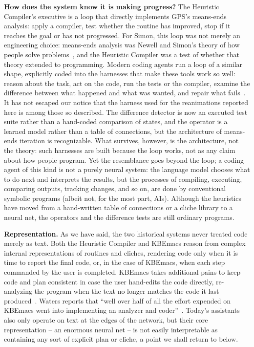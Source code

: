 \documentclass[11pt]{article}
\begin{document}
\textbf{How does the system know it is making progress?} The Heuristic
Compiler's executive is a loop that directly implements GPS's
means-ends analysis: apply a compiler, test whether the routine has
improved, stop if it reaches the goal or has not progressed. For
Simon, this loop was not merely an engineering choice: means-ends
analysis was Newell and Simon's theory of how people solve
problems~\cite{newelletat1958,newell1972hps}, and the Heuristic
Compiler was a test of whether that theory extended to programming.
Modern coding agents run a loop of a similar shape, explicitly coded
into the harnesses that make these tools work so well: reason about
the task, act on the code, run the tests or the compiler, examine the
difference between what happened and what was wanted, and repair what
fails~\cite{yao2023react,yang2024sweagent,schluntz2024agents,claudecodeworks}. It
has not escaped our notice that the harness used for the reanimations
reported here is among those so described. The difference detector is
now an executed test suite rather than a hand-coded comparison of
states, and the operator is a learned model rather than a table of
connections, but the architecture of means-ends iteration is
recognizable. What survives, however, is the architecture, not the
theory: such harnesses are built because the loop works, not as any
claim about how people program. Yet the resemblance goes beyond the
loop; a coding agent of this kind is not a purely neural system: the
language model chooses what to do next and interprets the results, but
the processes of compiling, executing, comparing outputs, tracking
changes, and so on, are done by conventional symbolic programs (albeit
not, for the most part, AIs). Although the heuristics have moved from
a hand-written table of connections or a cliche library to a neural
net, the operators and the difference tests are still ordinary
programs.

\textbf{Representation.} As we have said, the two historical systems
never treated code merely as text. Both the Heuristic Compiler and
KBEmacs reason from complex internal representations of routines and
cliches, rendering code only when it is time to report the final code,
or, in the case of KBEmacs, when each step commanded by the user is
completed. KBEmacs takes additional pains to keep code and plan
consistent in case the user hand-edits the code directly,
re-analyzing the program when the text no longer matches the code it
last produced~\cite{pitman1983wp244}. Waters
reports that ``well over half of all the effort expended on KBEmacs
went into implementing an analyzer and
coder''~\cite[p.~55]{waters1986aimag}. Today's assistants also only
operate on text at the edges of the network, but their core
representation -- an enormous neural net -- is not easily
interpretable as containing any sort of explicit plan or cliche, a
point we shall return to below.
\end{document}
